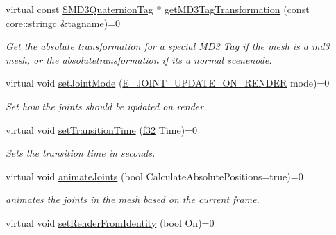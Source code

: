 \begin{DoxyCompactItemize}
\mbox{\label{classirr_1_1scene_1_1IAnimatedMeshSceneNode_abb3c2cee9c3271014c8615907d98c021}} 
virtual const \hyperlink{structirr_1_1scene_1_1SMD3QuaternionTag}{S\+M\+D3\+Quaternion\+Tag} $\ast$ \hyperlink{classirr_1_1scene_1_1IAnimatedMeshSceneNode_abb3c2cee9c3271014c8615907d98c021}{get\+M\+D3\+Tag\+Transformation} (const \hyperlink{namespaceirr_1_1core_ade1071a878633f2f6d8a75c5d11fec19}{core\+::stringc} \&tagname)=0
\begin{DoxyCompactList}\small\item\em Get the absolute transformation for a special M\+D3 Tag if the mesh is a md3 mesh, or the absolutetransformation if it\textquotesingle{}s a normal scenenode. \end{DoxyCompactList}\item 
\mbox{\label{classirr_1_1scene_1_1IAnimatedMeshSceneNode_a5ff68cb07badfbb01f491c0371c8b459}} 
virtual void \hyperlink{classirr_1_1scene_1_1IAnimatedMeshSceneNode_a5ff68cb07badfbb01f491c0371c8b459}{set\+Joint\+Mode} (\hyperlink{namespaceirr_1_1scene_a4a36461b5fa197ca3c6636c043413fa5}{E\+\_\+\+J\+O\+I\+N\+T\+\_\+\+U\+P\+D\+A\+T\+E\+\_\+\+O\+N\+\_\+\+R\+E\+N\+D\+ER} mode)=0
\begin{DoxyCompactList}\small\item\em Set how the joints should be updated on render. \end{DoxyCompactList}\item 
virtual void \hyperlink{classirr_1_1scene_1_1IAnimatedMeshSceneNode_a424d2dc577842949094a9d8c2a3eba0e}{set\+Transition\+Time} (\hyperlink{namespaceirr_a0277be98d67dc26ff93b1a6a1d086b07}{f32} Time)=0
\begin{DoxyCompactList}\small\item\em Sets the transition time in seconds. \end{DoxyCompactList}\item 
virtual void \hyperlink{classirr_1_1scene_1_1IAnimatedMeshSceneNode_a76af2c9a2b0cea6ee2b3559c1f32f850}{animate\+Joints} (bool Calculate\+Absolute\+Positions=true)=0
\begin{DoxyCompactList}\small\item\em animates the joints in the mesh based on the current frame. \end{DoxyCompactList}\item 
virtual void \hyperlink{classirr_1_1scene_1_1IAnimatedMeshSceneNode_aa3aa695d2e949bbc2ff17429951e77d0}{set\+Render\+From\+Identity} (bool On)=0

\end{DoxyCompactItemize}
